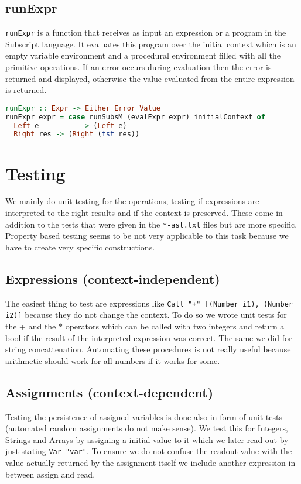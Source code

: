 \documentclass{article}
\begin{document}
\subsection{runExpr}

\texttt{runExpr} is a function that receives as input an expression or a program in the Subscript language. It evaluates this program over the initial context which is an empty variable environment and a procedural environment filled with all the primitive operations. If an error occurs during evaluation then the error is returned and displayed, otherwise the value evaluated from the entire expression is returned.

\begin{lstlisting}[language=Haskell]
runExpr :: Expr -> Either Error Value
runExpr expr = case runSubsM (evalExpr expr) initialContext of
  Left e          -> (Left e)
  Right res -> (Right (fst res))
\end{lstlisting}

\section{Testing}

We mainly do unit testing for the operations, testing if expressions are interpreted to the right results and if the context is preserved.
These come in addition to the tests that were given in the \texttt{*-ast.txt} files but are more specific.
Property based testing seems to be not very applicable to this task because we have to create very specific constructions.

\subsection{Expressions (context-independent)}
The easiest thing to test are expressions like \texttt{Call "+" [(Number i1), (Number i2)]} because they do not change the context.
To do so we wrote unit tests for the + and the $*$ operators which can be called with two integers and return a bool if the result of the interpreted expression was correct.
The same we did for string concattenation. Automating these procedures is not really useful because arithmetic should work for all numbers if it works for some.

\subsection{Assignments (context-dependent)}
Testing the persistence of assigned variables is done also in form of unit tests (automated random assignments do not make sense).
We test this for Integers, Strings and Arrays by assigning a initial value to it which we later read out by just stating \texttt{Var "var"}.
To ensure we do not confuse the readout value with the value actually returned by the assignment itself we include another expression in between assign and read.
\end{document}
